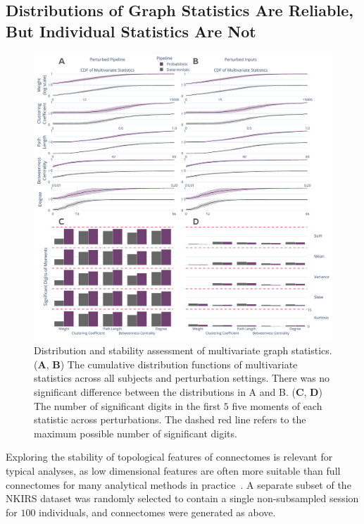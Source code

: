 \documentclass[fleqn,10pt]{SelfArx} %
\begin{document}
\subsection*{Distributions of Graph Statistics Are Reliable, But Individual Statistics Are Not}
\begin{figure}[bht!]\centering
\includegraphics[width=\linewidth]{figures/fig2_multivariate_differences.pdf}
\caption{Distribution and stability assessment of multivariate graph statistics. (\textbf{A}, \textbf{B}) The
cumulative distribution functions of multivariate statistics across all subjects and perturbation settings. There was
no significant difference between the distributions in A and B. (\textbf{C}, \textbf{D}) The number of significant
digits in the first $5$ five moments of each statistic across perturbations. The dashed red line refers to the maximum
possible number of significant digits.}
\label{fig:multivar}
\end{figure}

Exploring the stability of topological features of connectomes is relevant for typical analyses, as low dimensional
features are often more suitable than full connectomes for many analytical methods in practice~\cite{Rubinov2010-fh}.
A separate subset of the NKIRS dataset was randomly selected to contain a single non-subsampled session for $100$
individuals, and connectomes were generated as above.
\end{document}

